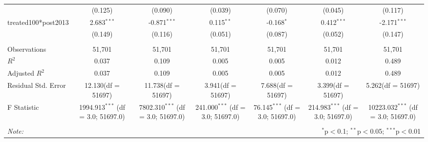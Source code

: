 \documentclass[12pt]{article}
\begin{document}
\begin{table}[!htbp]
\begin{tabular}{@{\extracolsep{5pt}}lcccccc}
  & (0.125) & (0.090) & (0.039) & (0.070) & (0.045) & (0.117) \\
 treated100*post2013 & 2.683$^{***}$ & -0.871$^{***}$ & 0.115$^{**}$ & -0.168$^{*}$ & 0.412$^{***}$ & -2.171$^{***}$ \\
  & (0.149) & (0.116) & (0.051) & (0.087) & (0.052) & (0.147) \\
\hline \\[-1.8ex]
 Observations & 51,701 & 51,701 & 51,701 & 51,701 & 51,701 & 51,701 \\
 $R^2$ & 0.037 & 0.109 & 0.005 & 0.005 & 0.012 & 0.489 \\
 Adjusted $R^2$ & 0.037 & 0.109 & 0.005 & 0.005 & 0.012 & 0.489 \\
 Residual Std. Error & 12.130(df = 51697) & 11.738(df = 51697) & 3.941(df = 51697) & 7.688(df = 51697) & 3.399(df = 51697) & 5.262(df = 51697)  \\
 F Statistic & 1994.913$^{***}$ (df = 3.0; 51697.0) & 7802.310$^{***}$ (df = 3.0; 51697.0) & 241.000$^{***}$ (df = 3.0; 51697.0) & 76.145$^{***}$ (df = 3.0; 51697.0) & 214.983$^{***}$ (df = 3.0; 51697.0) & 10223.032$^{***}$ (df = 3.0; 51697.0) \\
\hline
\hline \\[-1.8ex]
\textit{Note:} & \multicolumn{6}{r}{$^{*}$p$<$0.1; $^{**}$p$<$0.05; $^{***}$p$<$0.01} \\
\end{tabular}
\end{table}
\end{document}
